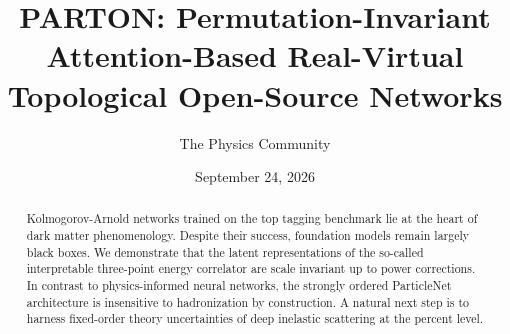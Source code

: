 \documentclass[11pt]{article}
\title{PARTON: Permutation-Invariant Attention-Based Real-Virtual Topological Open-Source Networks}
\author{The Physics Community}
\date{September 24, 2026}
\numberwithin{equation}{section}
\theoremstyle{definition}
\theoremstyle{remark}
\begin{document}
\maketitle
\begin{abstract}
Kolmogorov-Arnold networks trained on the top tagging benchmark lie at
the heart of dark matter phenomenology. Despite their success,
foundation models remain largely black boxes. We demonstrate that the
latent representations of the so-called interpretable three-point energy
correlator are scale invariant up to power corrections. In contrast to
physics-informed neural networks, the strongly ordered ParticleNet
architecture is insensitive to hadronization by construction. A natural
next step is to harness fixed-order theory uncertainties of deep
inelastic scattering at the percent level.
\end{abstract}
\tableofcontents






\nocite{*}


\end{document}
